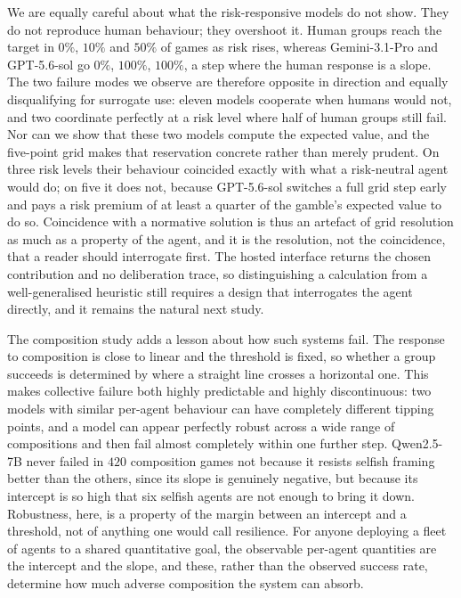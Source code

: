 \documentclass[openacc]{rsproca_new}
\begin{document}
We are equally careful about what the risk-responsive models do not show. They do not reproduce human behaviour; they overshoot it. Human groups reach the target in $0\%$, $10\%$ and $50\%$ of games as risk rises, whereas Gemini-3.1-Pro and GPT-5.6-sol go $0\%$, $100\%$, $100\%$, a step where the human response is a slope. The two failure modes we observe are therefore opposite in direction and equally disqualifying for surrogate use: eleven models cooperate when humans would not, and two coordinate perfectly at a risk level where half of human groups still fail. Nor can we show that these two models compute the expected value, and the five-point grid makes that reservation concrete rather than merely prudent. On three risk levels their behaviour coincided exactly with what a risk-neutral agent would do; on five it does not, because GPT-5.6-sol switches a full grid step early and pays a risk premium of at least a quarter of the gamble's expected value to do so. Coincidence with a normative solution is thus an artefact of grid resolution as much as a property of the agent, and it is the resolution, not the coincidence, that a reader should interrogate first. The hosted interface returns the chosen contribution and no deliberation trace, so distinguishing a calculation from a well-generalised heuristic still requires a design that interrogates the agent directly, and it remains the natural next study.

The composition study adds a lesson about how such systems fail. The response to composition is close to linear and the threshold is fixed, so whether a group succeeds is determined by where a straight line crosses a horizontal one. This makes collective failure both highly predictable and highly discontinuous: two models with similar per-agent behaviour can have completely different tipping points, and a model can appear perfectly robust across a wide range of compositions and then fail almost completely within one further step. Qwen2.5-7B never failed in $420$ composition games not because it resists selfish framing better than the others, since its slope is genuinely negative, but because its intercept is so high that six selfish agents are not enough to bring it down. Robustness, here, is a property of the margin between an intercept and a threshold, not of anything one would call resilience. For anyone deploying a fleet of agents to a shared quantitative goal, the observable per-agent quantities are the intercept and the slope, and these, rather than the observed success rate, determine how much adverse composition the system can absorb.
\end{document}
